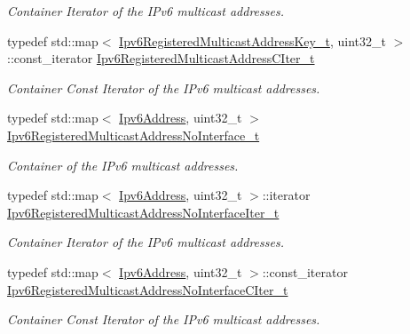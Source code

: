 \begin{DoxyCompactItemize}
\begin{DoxyCompactList}\small\item\em Container Iterator of the I\+Pv6 multicast addresses. \end{DoxyCompactList}\item 
typedef std\+::map$<$ \hyperlink{classns3_1_1Ipv6L3Protocol_ad85035c0604805049efdc7a5b3d99082}{Ipv6\+Registered\+Multicast\+Address\+Key\+\_\+t}, uint32\+\_\+t $>$\+::const\+\_\+iterator \hyperlink{classns3_1_1Ipv6L3Protocol_a656104cdf393b6e6a41c79d172c8e8fb}{Ipv6\+Registered\+Multicast\+Address\+C\+Iter\+\_\+t}
\begin{DoxyCompactList}\small\item\em Container Const Iterator of the I\+Pv6 multicast addresses. \end{DoxyCompactList}\item 
typedef std\+::map$<$ \hyperlink{classns3_1_1Ipv6Address}{Ipv6\+Address}, uint32\+\_\+t $>$ \hyperlink{classns3_1_1Ipv6L3Protocol_a21d330eef03b790c7ff3330abfa738fa}{Ipv6\+Registered\+Multicast\+Address\+No\+Interface\+\_\+t}
\begin{DoxyCompactList}\small\item\em Container of the I\+Pv6 multicast addresses. \end{DoxyCompactList}\item 
typedef std\+::map$<$ \hyperlink{classns3_1_1Ipv6Address}{Ipv6\+Address}, uint32\+\_\+t $>$\+::iterator \hyperlink{classns3_1_1Ipv6L3Protocol_ae91d00bae00de8b86d6bacdf8101864b}{Ipv6\+Registered\+Multicast\+Address\+No\+Interface\+Iter\+\_\+t}
\begin{DoxyCompactList}\small\item\em Container Iterator of the I\+Pv6 multicast addresses. \end{DoxyCompactList}\item 
typedef std\+::map$<$ \hyperlink{classns3_1_1Ipv6Address}{Ipv6\+Address}, uint32\+\_\+t $>$\+::const\+\_\+iterator \hyperlink{classns3_1_1Ipv6L3Protocol_a635e981d0b583b98e00909163710dea9}{Ipv6\+Registered\+Multicast\+Address\+No\+Interface\+C\+Iter\+\_\+t}
\begin{DoxyCompactList}\small\item\em Container Const Iterator of the I\+Pv6 multicast addresses. \end{DoxyCompactList}\end{DoxyCompactItemize}
